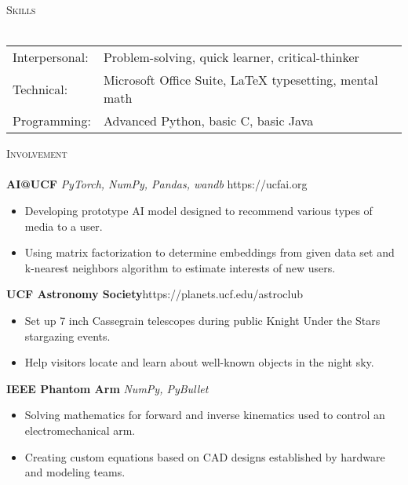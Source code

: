 \documentclass[letterpaper]{article}
\newcommand{\lineunder} {
    \vspace*{-8pt} \\
    \hspace*{-18pt} \hrulefill \\
}
\newcommand{\header} [1] {
    {\hspace*{-18pt}\vspace*{12pt} \large\textsc{#1}}
    \vspace*{-12pt} \lineunder
}
\begin{document}
\header{Skills}
\vspace{1mm}
\begin{tabular}{ l l }
	Interpersonal: & Problem-solving, quick learner, critical-thinker              \\
	Technical:     & Microsoft Office Suite, LaTeX typesetting, mental math        \\
	Programming:   & Advanced Python, basic C, basic Java                          \\
\end{tabular}
\vspace{3mm}


\header{Involvement}

{\textbf{AI@UCF}} {\sl PyTorch, NumPy, Pandas, wandb} \hfill https://ucfai.org\\
\begin{itemize}[topsep=0pt] \itemsep 1pt
    \item Developing prototype AI model designed to recommend various types of media to a user.
    \item Using matrix factorization to determine embeddings from given data set and k-nearest neighbors algorithm to estimate interests of new users.\\
\end{itemize}
\vspace*{2mm}

{\textbf{UCF Astronomy Society}}\hfill https://planets.ucf.edu/astroclub\\
\begin{itemize}[topsep=0pt] \itemsep 1pt
    \item Set up 7 inch Cassegrain telescopes during public Knight Under the Stars stargazing events.
    \item Help visitors locate and learn about well-known objects in the night sky.\\
\end{itemize}
\vspace*{2mm}

{\textbf{IEEE Phantom Arm}} {\sl NumPy, PyBullet} \\
\begin{itemize}[topsep=0pt] \itemsep 1pt
    \item Solving mathematics for forward and inverse kinematics used to control an electromechanical arm.
    \item Creating custom equations based on CAD designs established by hardware and modeling teams.\\
\end{itemize}
\vspace{3mm}
\end{document}
